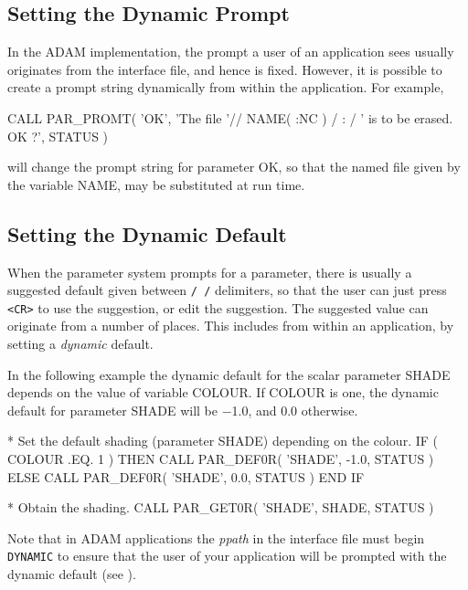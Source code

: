 \documentclass[twoside,11pt,nolof]{starlink}
\begin{document}
\subsection{Setting the Dynamic Prompt}

In the ADAM implementation, the prompt a user of an application sees
usually originates from the interface file, and hence is fixed.
However, it is possible to create a prompt string dynamically from
within the application. For example,

\begin{terminalv}
       CALL PAR_PROMT( 'OK', 'The file '// NAME( :NC ) /
      :                / ' is to be erased. OK ?', STATUS )
\end{terminalv}

will change the prompt string for parameter OK, so that the named
file given by the variable NAME, may be substituted at run time.

\subsection{Setting the Dynamic Default}

When the parameter system prompts for a parameter, there is usually a
suggested default given between \texttt{/ /} delimiters, so that the user
can just press \texttt{<CR>} to use the suggestion, or edit the suggestion.
The suggested value can originate from a number of places.  This
includes from within an application, by setting a \emph{dynamic\/}
default.

In the following example the dynamic default for the scalar parameter
SHADE depends on the value of variable COLOUR.  If COLOUR is one, the
dynamic default for parameter SHADE will be $-$1.0, and 0.0 otherwise.

\begin{terminalv}
*  Set the default shading (parameter SHADE) depending on the colour.
      IF ( COLOUR .EQ. 1 ) THEN
         CALL PAR_DEF0R( 'SHADE', -1.0, STATUS )
      ELSE
         CALL PAR_DEF0R( 'SHADE', 0.0, STATUS )
      END IF

*  Obtain the shading.
      CALL PAR_GET0R( 'SHADE', SHADE, STATUS )
\end{terminalv}


Note that in {\footnotesize ADAM} applications the \emph{ppath\/} in the
interface file must begin \texttt{DYNAMIC} to ensure that the user of your
application will be prompted with the dynamic default (see
).
\end{document}
